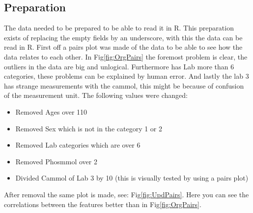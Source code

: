\documentclass{article}
\begin{document}
    \subsection{Preparation}
      The data needed to be prepared to be able to read it in R.
      This preparation exists of replacing the empty fields by an underscore, with this the data can be read in R.
      First off a pairs plot was made of the data to be able to see how the data relates to each other.
      In Fig\ref{fig:OrgPairs} the foremost problem is clear, the outliers in the data are big and unlogical.
      Furthermore has Lab more than 6 categories, these problems can be explained by human error.
      And lastly the lab 3 has strange measurements with the cammol, this might be because of confusion of the measurement unit.
      The following values were changed:
      \begin{itemize}
        \item Removed Ages over 110
        \item Removed Sex which is not in the category 1 or 2
        \item Removed Lab categories which are over 6
        \item Removed Phosmmol over 2
        \item Divided Cammol of Lab 3 by 10 (this is visually tested by using a pairs plot)
      \end{itemize}
      After removal the same plot is made, see: Fig\ref{fig:UpdPairs}.
      Here you can see the correlations between the features better than in Fig\ref{fig:OrgPairs}.
\end{document}
